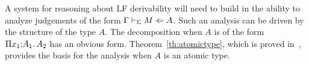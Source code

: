 


A system for reasoning about LF derivability will need to build in the
ability to analyze judgements of the form $\Gamma \vdash_{\Sigma} M\Leftarrow A$.
%
Such an analysis can be driven by the structure of the type $A$.
%
The decomposition when $A$ is of the form $\Pi {x_1}{:}{A_1}.{\mkern 3mu} A_2$
has an obvious form.
%
Theorem~\ref{th:atomictype}, which is proved
in~\cite{nadathur21arxiv}, provides the basis for the analysis when
$A$ is an atomic type.  

